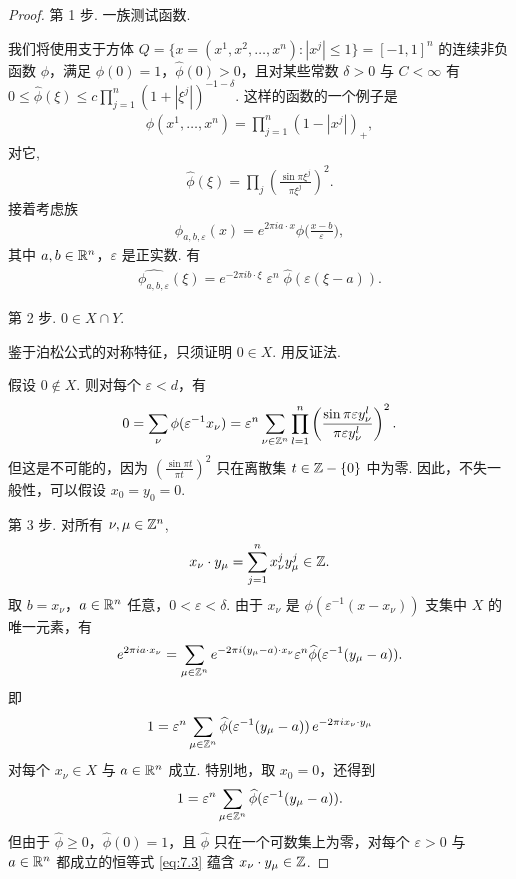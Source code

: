 \begin{proof}
第 1 步. 一族测试函数.

我们将使用支于方体 $Q = \{x = (x^1, x^2, \ldots, x^n) : |x^j| \leq 1\} = [-1, 1]^n$ 的连续非负函数 $\phi$，满足 $\phi(0) = 1$，$\widehat{\phi}(0) > 0$，且对某些常数 $\delta > 0$ 与 $C < \infty$ 有 $0 \leq \widehat{\phi}(\xi) \leq c\prod_{j=1}^n (1 + |\xi^j|)^{-1-\delta}$. 这样的函数的一个例子是
\begin{align*}
  \phi(x^{1},\ldots,x^{n})=\prod_{j=1}^{n}(1-|x^{j}|)_{+},
\end{align*}
对它,
\begin{align*}
  \widehat{\phi}(\xi)=\prod_{j}\left(\frac{\sin\pi\xi^{j}}{\pi\xi^{j}}\right)^{2}.
\end{align*}
接着考虑族
\begin{align*}
  \phi_{a,b,\varepsilon}(x)=e^{2\pi i a\cdot x}\phi\Big(\frac{x-b}{\varepsilon}\Big),
\end{align*}
其中 $a, b \in \mathbb{R}^n$，$\varepsilon$ 是正实数. 有
\begin{align*}
  \widehat{\phi_{a,b,\varepsilon}}(\xi)=e^{-2\pi i b\cdot\xi}\;\varepsilon^{n}\;\widehat{\phi}(\varepsilon(\xi-a)).
\end{align*}

第 2 步. $0 \in X \cap Y$.

鉴于泊松公式的对称特征，只须证明 $0 \in X$. 用反证法.

假设 $0 \notin X$. 则对每个 $\varepsilon < d$，有
\begin{align*}
  0=\sum_{\nu}\phi(\varepsilon^{-1}x_{\nu})
  =\varepsilon^{n}\sum_{\nu\in\mathbb{Z}^{n}}\prod_{l=1}^{n}\left(\frac{\sin\pi\varepsilon y_{\nu}^{l}}{\pi\varepsilon y_{\nu}^{l}}\right)^{2}.
\end{align*}
但这是不可能的，因为 $\left(\frac{\sin\pi t}{\pi t}\right)^2$ 只在离散集 $t \in \mathbb{Z} - \{0\}$ 中为零. 因此，不失一般性，可以假设 $x_0 = y_0 = 0$.

第 3 步. 对所有 $\nu, \mu \in \mathbb{Z}^n$,
\begin{align*}
  x_{\nu}\cdot y_{\mu}=\sum_{j=1}^{n}x_{\nu}^{j}y_{\mu}^{j}\in\mathbb{Z}.
\end{align*}
取 $b = x_\nu$，$a \in \mathbb{R}^n$ 任意，$0 < \varepsilon < \delta$. 由于 $x_\nu$ 是 $\phi(\varepsilon^{-1}(x - x_\nu))$ 支集中 $X$ 的唯一元素，有
\begin{align*}
  e^{2\pi i a\cdot x_{\nu}}
  =\sum_{\mu\in\mathbb{Z}^{n}}e^{-2\pi i(y_{\mu}-a)\cdot x_{\nu}}\varepsilon^{n}\widehat{\phi}(\varepsilon^{-1}(y_{\mu}-a)).
\end{align*}
即
\begin{equation}\label{eq:7.3}
  1=\varepsilon^{n}\sum_{\mu\in\mathbb{Z}^{n}}\widehat{\phi}(\varepsilon^{-1}(y_{\mu}-a))\,e^{-2\pi i x_{\nu}\cdot y_{\mu}}
\end{equation}
对每个 $x_\nu \in X$ 与 $a \in \mathbb{R}^n$ 成立. 特别地，取 $x_0 = 0$，还得到
\begin{align*}
  1=\varepsilon^{n}\sum_{\mu\in\mathbb{Z}^{n}}\widehat{\phi}(\varepsilon^{-1}(y_{\mu}-a)).
\end{align*}
但由于 $\widehat{\phi} \geq 0$，$\widehat{\phi}(0) = 1$，且 $\widehat{\phi}$ 只在一个可数集上为零，对每个 $\varepsilon > 0$ 与 $a \in \mathbb{R}^n$ 都成立的恒等式 \eqref{eq:7.3} 蕴含 $x_\nu \cdot y_\mu \in \mathbb{Z}$.


\end{proof}
